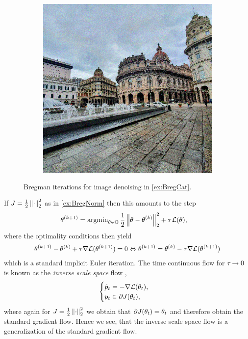 \begin{figure}
\begin{minipage}{\textwidth}
\begin{subfigure}{.3\textwidth}
%
\end{subfigure}\hfill%
\begin{subfigure}{.3\textwidth}%
\includegraphics[width=\textwidth]{atelier/breg_cat/data.png}
\end{subfigure}%
\end{minipage}%
%
\caption{Bregman iterations for image denoising in \cref{ex:BregCat}.}\label{fig:BregCat}
\end{figure}%
%
%
\noindent
If $J=\frac{1}{2}\left\|\cdot\right\|_2^2$ as in \cref{ex:BregNorm} then this amounts to the step
%
\begin{align*}
\theta^{(k+1)} &= \operatorname{argmin}_{\theta\in\Theta} \frac{1}{2}\left\|\theta - \theta^{(k)}\right\|^2_2 + \tau^{}\mathcal{L}(\theta),
\end{align*}
%
where the optimality conditions then yield
%
\begin{align*}
\theta^{(k+1)} - \theta^{(k)} + \tau \nabla \mathcal{L}(\theta^{(k+1)}) = 0
\Leftrightarrow \theta^{(k+1)}= \theta^{(k)} - \tau \nabla \mathcal{L}(\theta^{(k+1)})
\end{align*}
%
which is a standard implicit Euler iteration. The time continuous flow for $\tau\to 0$ is known as the \emph{inverse scale space} flow \cite{burger2006nonlinear,burger2007inverse},
%
\begin{align*}
\begin{cases}
    \dot{p}_t = - \nabla\mathcal{L}(\theta_t), \\
    p_t \in \partial J(\theta_t),
\end{cases}
\end{align*}
%
where again for $J=\frac{1}{2}\left\|\cdot\right\|_2^2$ we obtain that $\partial J(\theta_t) = \theta_t$ and therefore obtain the standard gradient flow. Hence we see, that the inverse scale space flow is a generalization of the standard gradient flow. 
%
%
%
